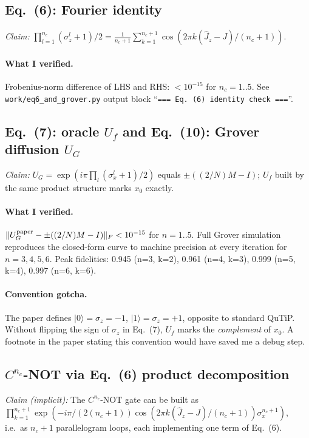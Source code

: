 \documentclass[11pt]{article}
\begin{document}
\subsection{Eq.~(6): Fourier identity}
\emph{Claim:} $\prod_{l=1}^{n_c}(\sigma_z^l+1)/2 = \frac{1}{n_c+1}\sum_{k=1}^{n_c+1}\cos(2\pi k(\hat J_z-J)/(n_c+1))$.

\paragraph{What I verified.} Frobenius-norm difference of LHS and RHS: $<10^{-15}$ for
$n_c=1..5$.  See \verb|work/eq6_and_grover.py| output block ``\texttt{=== Eq. (6) identity check ===}''.

\subsection{Eq.~(7): oracle $U_f$ and Eq.~(10): Grover diffusion $U_G$}
\emph{Claim:} $U_G = \exp(i\pi\prod_l(\sigma_x^l+1)/2)$ equals $\pm((2/N)M-I)$; $U_f$ built
by the same product structure marks $x_0$ exactly.

\paragraph{What I verified.} $\|U_G^{\rm paper} - \pm((2/N)M-I)\|_F < 10^{-15}$ for $n=1..5$.
Full Grover simulation reproduces the closed-form curve to machine precision at every
iteration for $n=3,4,5,6$.  Peak fidelities: 0.945 (n=3, k=2), 0.961 (n=4, k=3),
0.999 (n=5, k=4), 0.997 (n=6, k=6).

\paragraph{Convention gotcha.} The paper defines $|0\rangle=\sigma_z=-1$,
$|1\rangle=\sigma_z=+1$, opposite to standard QuTiP.  Without flipping the sign of $\sigma_z$
in Eq.~(7), $U_f$ marks the \emph{complement} of $x_0$.  A footnote in the paper stating
this convention would have saved me a debug step.

\subsection{$C^{n_c}$-NOT via Eq.~(6) product decomposition}
\emph{Claim (implicit):} The $C^{n_c}$-NOT gate can be built as
$\prod_{k=1}^{n_c+1}\exp(-i\pi/(2(n_c+1))\cos(2\pi k(\hat J_z-J)/(n_c+1))\sigma_x^{n_c+1})$,
i.e.\ as $n_c+1$ parallelogram loops, each implementing one term of Eq.~(6).
\end{document}
